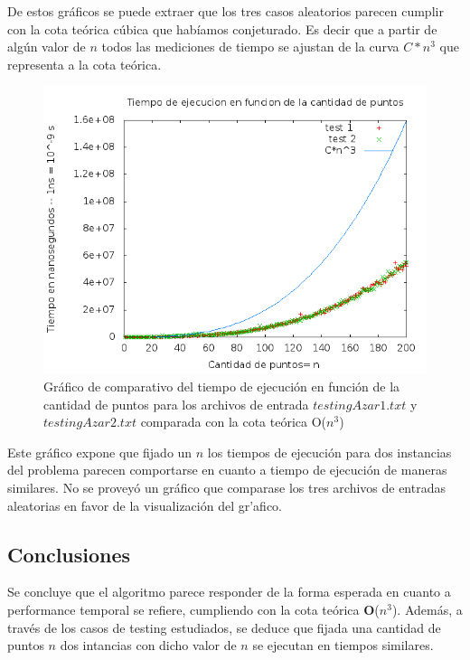\indent De estos gr\'aficos se puede extraer que los tres casos aleatorios parecen cumplir con la cota te\'orica c\'ubica que hab\'iamos conjeturado. Es decir que a partir de alg\'un valor de $n$ todos las mediciones de tiempo se ajustan de la curva $C*n^3$ que representa a la cota te\'orica.\\


\begin{figure}[H]
	\centering
	\includegraphics[scale=0.6]{ej3-compTestAzarEj3.png}
	\caption{ Gr\'afico de comparativo del tiempo de ejecuci\'on en funci\'on de la cantidad de puntos para los archivos de entrada $testingAzar1.txt$ y $testingAzar2.txt$ comparada con la cota te\'orica O($n^3$)}
\end{figure}

\indent Este gr\'afico expone que fijado un $n$ los tiempos de ejecuci\'on para dos instancias del problema parecen comportarse en cuanto a tiempo de ejecuci\'on de maneras similares. No se provey\'o un gr\'afico que comparase los tres archivos de entradas aleatorias en favor de la visualizaci\'on del gr'afico.\\

\subsection{Conclusiones}

\indent Se concluye que el algoritmo parece responder de la forma esperada en cuanto a performance temporal se refiere, cumpliendo con la cota te\'orica \textbf{O}($n^3$). Además, a trav\'es de los casos de testing estudiados, se deduce que fijada una cantidad de puntos $n$ dos intancias con dicho valor de $n$ se ejecutan en tiempos similares.\\ 


